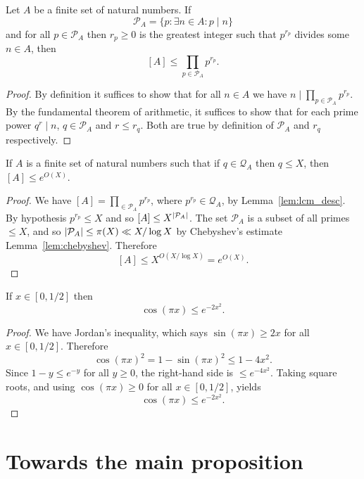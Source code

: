 \begin{lemma}\label{lem:lcm_desc}
Let $A$ be a finite set of natural numbers. If
\[\mathcal{P}_A = \{ p : \exists n\in A : p \mid n\}\]
and for all $p\in \mathcal{P}_A$ then $r_p\geq 0$ is the greatest integer such that $p^{r_p}$ divides some $n\in A$, then
\[[A]\leq \prod_{p\in\mathcal{P}_A}p^{r_p}.\]
\end{lemma}
\begin{proof}
By definition it suffices to show that for all $n\in A$ we have $n\mid \prod_{p\in\mathcal{P}_A}p^{r_p}$. By the fundamental theorem of arithmetic, it suffices to show that for each prime power $q^r\mid n$, $q\in \mathcal{P}_A$ and $r\leq r_q$. Both are true by definition of $\mathcal{P}_A$ and $r_q$ respectively.
\end{proof}

\begin{lemma}\label{lem:smooth_lcm}
If $A$ is a finite set of natural numbers such that if $q\in\mathcal{Q}_A$ then $q\leq X$, then $[A]\leq e^{O(X)}$.
\end{lemma}
\begin{proof}
We have $[A]=\prod_{\in\mathcal{P}_A}p^{r_p}$, where $p^{r_p}\in \mathcal{Q}_A$, by Lemma~\ref{lem:lcm_desc}. By hypothesis $p^{r_p}\leq X$ and so $[A]\leq X^{\left\lvert \mathcal{P}_A\right\rvert}$. The set $\mathcal{P}_A$ is a subset of all primes $\leq X$, and so $\left\lvert \mathcal{P}_A\right\rvert\leq \pi(X)\ll X/\log X$ by Chebyshev's estimate Lemma~\ref{lem:chebyshev}. Therefore
\[[A]\leq X^{O(X/\log X)}=e^{O(X)}.\]
\end{proof}

\begin{lemma}\label{lem:cos_bound}
If $x\in [0,1/2]$ then
\[\cos(\pi x) \leq e^{-2x^2}.\]
\end{lemma}
\begin{proof}
We have Jordan's inequality, which says $\sin(\pi x)\geq 2x$ for all $x\in[0,1/2]$. Therefore
\[\cos(\pi x)^2 = 1-\sin(\pi x)^2\leq 1-4x^2.\]
Since $1-y\leq e^{-y}$ for all $y\geq 0$, the right-hand side is $\leq e^{-4x^2}$. Taking square roots, and using $\cos(\pi x)\geq 0$ for all $x\in[0,1/2]$, yields
\[\cos(\pi x) \leq e^{-2x^2}.\]
\end{proof}

\section{Towards the main proposition}


